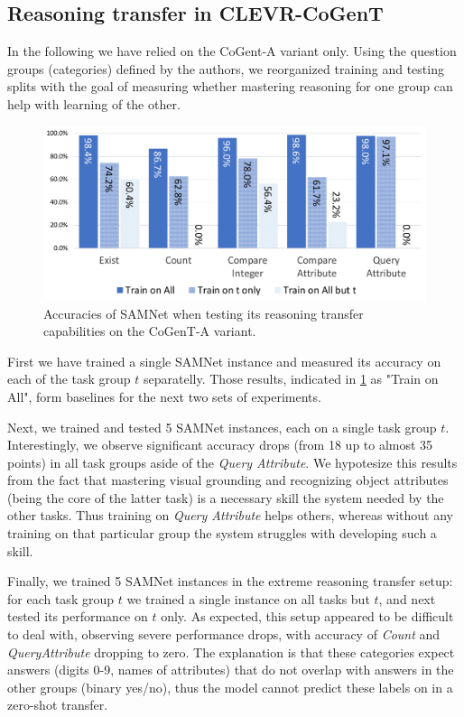 \subsection{Reasoning transfer in CLEVR-CoGenT}
\label{sec:reasoning-transfer-clevr}
In the following we have relied on the CoGent-A variant only.
Using the question groups (categories) defined by the authors, we reorganized training and testing splits with the goal of measuring whether mastering reasoning for one group can help with learning of the other.

\begin{figure}[htbp]
	\centering
	\includegraphics[width=\columnwidth]{../img/plots/cogent_reasoning_transfer.pdf}
	\caption{Accuracies of SAMNet when testing its reasoning transfer capabilities on the CoGenT-A variant.}
	\label{fig:cogent_reasoning_transfer}
\end{figure}

First we have trained a single SAMNet instance and measured its accuracy on each of the task group $t$ separatelly.
Those results, indicated in \cref{fig:cogent_reasoning_transfer} as "Train on All", form baselines for the next two sets of experiments.

Next, we trained and tested 5 SAMNet instances, each on a single task group $t$.
Interestingly, we observe significant accuracy drops (from 18 up to almost 35 points) in all task groups aside of the \textit{Query Attribute}.
We hypotesize this results from the fact that mastering visual grounding and recognizing object attributes (being the core of the latter task) is a necessary skill the system needed by the other tasks.
Thus training on \textit{Query Attribute} helps others, whereas without any training on that particular group the system struggles with developing such a skill.

Finally, we trained 5 SAMNet instances in the extreme reasoning transfer setup: for each task group $t$ we trained a single instance on all tasks but $t$, and next tested its performance on $t$ only.
As expected, this setup appeared to be difficult to deal with, observing severe performance drops, with accuracy of \textit{Count} and \textit{QueryAttribute} dropping to zero.
The explanation is that these categories expect  answers (digits 0-9, names of attributes) that do not overlap with answers in the other groups (binary yes/no), thus the model cannot predict these labels on in a zero-shot transfer.

